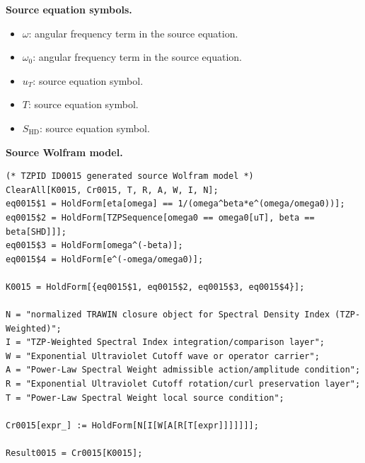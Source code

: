 \begin{minipage}[t]{0.49\linewidth}
\begingroup
\small
\raggedright
\textbf{Source equation symbols.}\par
\begin{itemize}[leftmargin=1.35em,itemsep=1pt,topsep=1pt,parsep=0pt]
    \item $\omega$: angular frequency term in the source equation.
    \item $\omega_{0}$: angular frequency term in the source equation.
    \item $u_{T}$: source equation symbol.
    \item $T$: source equation symbol.
    \item $S_{\mathrm{HD}}$: source equation symbol.
\end{itemize}
\endgroup
\end{minipage}\hfill
\begin{minipage}[t]{0.47\linewidth}
\begingroup
\scriptsize
\raggedright
\textbf{Source Wolfram model.}\par
\begin{Verbatim}[fontsize=\tiny,breaklines=true,breakanywhere=true]
(* TZPID ID0015 generated source Wolfram model *)
ClearAll[K0015, Cr0015, T, R, A, W, I, N];
eq0015$1 = HoldForm[eta[omega] == 1/(omega^beta*e^(omega/omega0))];
eq0015$2 = HoldForm[TZPSequence[omega0 == omega0[uT], beta == beta[SHD]]];
eq0015$3 = HoldForm[omega^(-beta)];
eq0015$4 = HoldForm[e^(-omega/omega0)];

K0015 = HoldForm[{eq0015$1, eq0015$2, eq0015$3, eq0015$4}];

N = "normalized TRAWIN closure object for Spectral Density Index (TZP-Weighted)";
I = "TZP-Weighted Spectral Index integration/comparison layer";
W = "Exponential Ultraviolet Cutoff wave or operator carrier";
A = "Power-Law Spectral Weight admissible action/amplitude condition";
R = "Exponential Ultraviolet Cutoff rotation/curl preservation layer";
T = "Power-Law Spectral Weight local source condition";

Cr0015[expr_] := HoldForm[N[I[W[A[R[T[expr]]]]]]];

Result0015 = Cr0015[K0015];
\end{Verbatim}
\endgroup
\end{minipage}


